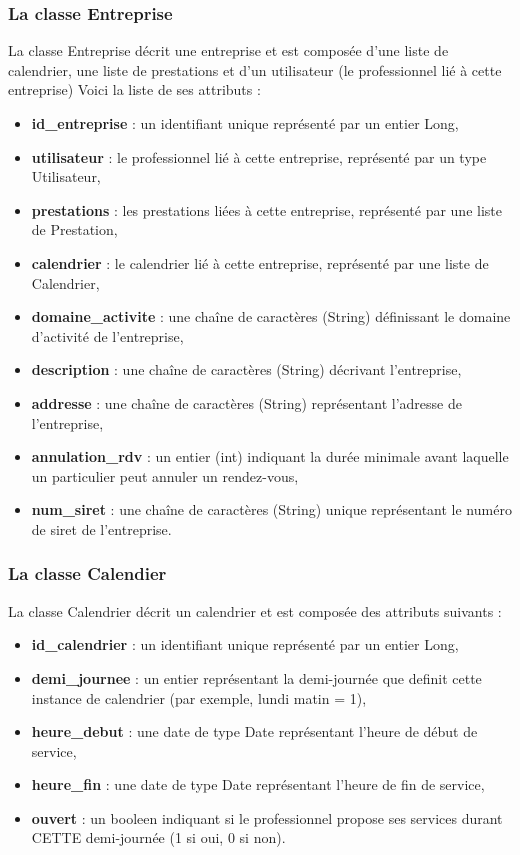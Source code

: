 \documentclass{article}
\begin{document}
\subsubsection{La classe Entreprise}
La classe Entreprise décrit une entreprise et est composée d'une liste de calendrier, une liste de prestations et d'un utilisateur (le professionnel lié à cette entreprise) 
Voici la liste de ses attributs :
\begin{itemize}
\item \textbf{id\_entreprise} : un identifiant unique représenté par un entier Long,
\item \textbf{utilisateur} : le professionnel lié à cette entreprise, représenté par un type Utilisateur,
\item \textbf{prestations} : les prestations liées à cette entreprise, représenté par une liste de Prestation,
\item \textbf{calendrier} : le calendrier lié à cette entreprise, représenté par une liste de Calendrier,
\item \textbf{domaine\_activite} : une chaîne de caractères (String) définissant le domaine d'activité de l'entreprise,
\item \textbf{description} : une chaîne de caractères (String) décrivant l'entreprise,
\item \textbf{addresse} : une chaîne de caractères (String) représentant l'adresse de l'entreprise,
\item \textbf{annulation\_rdv} : un entier (int) indiquant la durée minimale avant laquelle un particulier peut annuler un rendez-vous,
\item \textbf{num\_siret} : une chaîne de caractères (String) unique représentant le numéro de siret de l'entreprise.
\end{itemize}

\subsubsection{La classe Calendier}
La classe Calendrier décrit un calendrier et est composée des attributs suivants :
\begin{itemize}
\item \textbf{id\_calendrier} : un identifiant unique représenté par un entier Long,
\item \textbf{demi\_journee} : un entier représentant la demi-journée que definit cette instance de calendrier (par exemple, lundi matin = 1),
\item \textbf{heure\_debut} : une date de type Date représentant l'heure de début de service,
\item \textbf{heure\_fin} : une date de type Date représentant l'heure de fin de service,
\item \textbf{ouvert} : un booleen indiquant si le professionnel propose ses services durant CETTE demi-journée (1 si oui, 0 si non).
\end{itemize}
\end{document}
